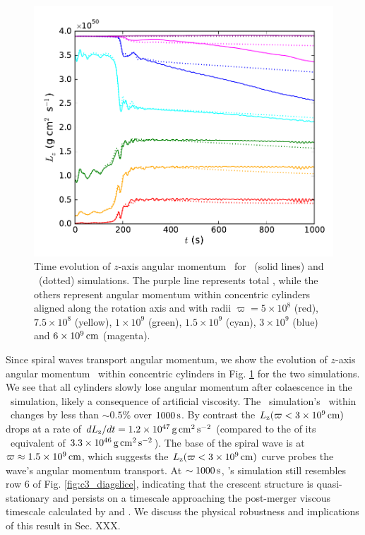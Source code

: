 \begin{figure}
\centering
\includegraphics[angle=0,width=0.6\columnwidth]{chapter3_zhu+u/figures/Lz.pdf}
\caption{Time evolution of $z$-axis angular momentum \Lz\ for \arepo\ (solid lines) and \gasoline\ (dotted) simulations.  The purple line represents total \Lz, while the others represent angular momentum within concentric cylinders aligned along the rotation axis and with radii $\varpi = 5\times10^8$ (red), $7.5\times10^8$ (yellow), $1\times10^9$ (green), $1.5\times10^9$ (cyan), $3\times10^9$ (blue) and $6\times10^9\,\mathrm{cm}$ (magenta).}
\label{fig:c3_angmo}
\end{figure}

Since spiral waves transport angular momentum, we show the evolution of $z$-axis angular momentum \Lz\ within concentric cylinders in Fig. \ref{fig:c3_angmo} for the two simulations.  We see that all cylinders slowly lose angular momentum after colaescence in the \gasoline\ simulation, likely a consequence of artificial viscosity.  The \arepo\ simulation's \Lz\ within \innercyl\ changes by less than $\sim0.5$\% over $1000\,\mathrm{s}$.  By contrast the $\Lz(\varpi < 3\times10^9\,\mrm{cm})$ drops at a rate of $d\Lz/dt = 1.2\times10^{47}\,\mrm{g}\,\mrm{cm}^2\,\mrm{s}^{-2}$ (compared to the of its \gasoline\ equivalent of $3.3\times10^{46}\,\mathrm{g}\,\mathrm{cm}^2\,\mathrm{s}^{-2}$).  The base of the spiral wave is at $\varpi \approx 1.5\times10^9\,\mathrm{cm}$, which suggests the $\Lz(\varpi < 3\times10^9\,\mrm{cm})$ curve probes the wave's angular momentum transport.  At $\sim1000\,\mathrm{s}$, \arepo's simulation still resembles row 6 of Fig. \ref{fig:c3_diagslice}, indicating that the crescent structure is quasi-stationary and persists on a timescale approaching the post-merger viscous timescale calculated by \citealt{vkercj10} and \cite{shen+12}.  We discuss the physical robustness and implications of this result in Sec. {\charles XXX}.

